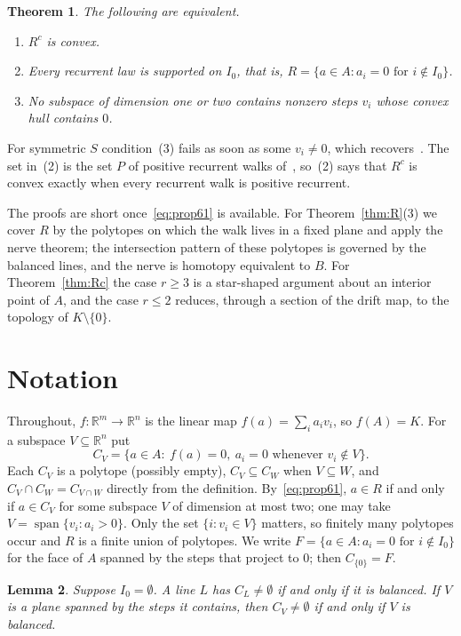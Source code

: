 \documentclass[11pt]{amsart}
\newtheorem{theorem}{Theorem}[section]
\newtheorem{lemma}[theorem]{Lemma}
\theoremstyle{remark}
\newcommand{\R}{\mathbb{R}}
\newcommand{\spn}{\operatorname{span}}
\begin{document}
\begin{theorem}\label{thm:convex}
The following are equivalent.
\begin{enumerate}
\item $R^c$ is convex.
\item Every recurrent law is supported on $I_0$, that is, $R=\{a\in A: a_i=0\text{ for }i\notin I_0\}$.
\item No subspace of dimension one or two contains nonzero steps $v_i$ whose convex hull contains $0$.
\end{enumerate}
\end{theorem}

For symmetric $S$ condition~(3) fails as soon as some $v_i\ne0$, which recovers~\cite[Proposition~6.12]{LMW}. The set
in~(2) is the set $P$ of positive recurrent walks of~\cite[Remark~6.14]{LMW}, so~(2) says that $R^c$ is convex exactly
when every recurrent walk is positive recurrent.

The proofs are short once~\eqref{eq:prop61} is available. For Theorem~\ref{thm:R}(3) we cover $R$ by the polytopes on
which the walk lives in a fixed plane and apply the nerve theorem; the intersection pattern of these polytopes is
governed by the balanced lines, and the nerve is homotopy equivalent to $B$. For Theorem~\ref{thm:Rc} the case $r\ge3$ is a
star-shaped argument about an interior point of $A$, and the case $r\le2$ reduces, through a section of the drift map,
to the topology of $K\setminus\{0\}$.

\section{Notation}\label{sec:notation}

Throughout, $f:\R^m\to\R^n$ is the linear map $f(a)=\sum_ia_iv_i$, so $f(A)=K$. For a subspace $V\subseteq\R^n$ put
\[
C_V=\{a\in A:\ f(a)=0,\ a_i=0\text{ whenever }v_i\notin V\}.
\]
Each $C_V$ is a polytope (possibly empty), $C_V\subseteq C_W$ when $V\subseteq W$, and $C_V\cap C_W=C_{V\cap W}$
directly from the definition. By~\eqref{eq:prop61}, $a\in R$ if and only if $a\in C_V$ for some subspace $V$ of
dimension at most two; one may take $V=\spn\{v_i:a_i>0\}$. Only the set $\{i: v_i\in V\}$ matters, so finitely many
polytopes occur and $R$ is a finite union of polytopes. We write $F=\{a\in A: a_i=0\text{ for }i\notin I_0\}$ for the
face of $A$ spanned by the steps that project to $0$; then $C_{\{0\}}=F$.

\begin{lemma}\label{lem:nonempty}
Suppose $I_0=\emptyset$. A line $L$ has $C_L\ne\emptyset$ if and only if it is balanced. If $V$ is a plane spanned by
the steps it contains, then $C_V\ne\emptyset$ if and only if $V$ is balanced.
\end{lemma}
\end{document}
